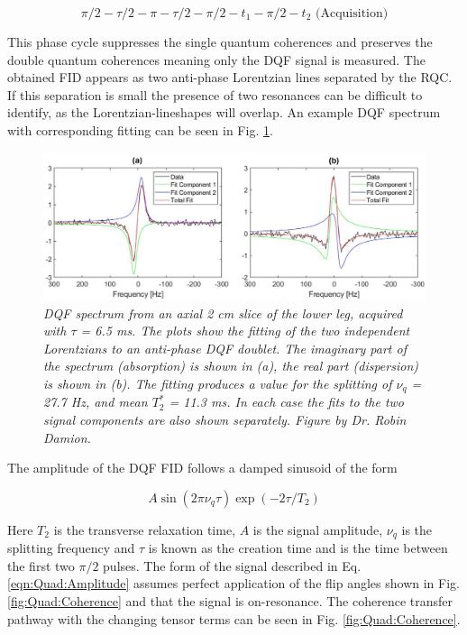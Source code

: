 \begin{equation}
    \pi/2-\tau/2-\pi-\tau/2-\pi/2-t_1-\pi/2-t_2 \textrm{ (Acquisition)}
    \label{eqn:Quad:Pulse}
\end{equation}

This phase cycle suppresses the single quantum coherences and preserves the double quantum coherences meaning only the \ac{DQF} signal is measured. The obtained FID appears as two anti-phase Lorentzian lines separated by the \ac{RQC}. If this separation is small the presence of two resonances can be difficult to identify, as the Lorentzian-lineshapes will overlap. An example \ac{DQF} spectrum with corresponding fitting can be seen in Fig. \ref{fig:Quad:Ex_DQF}. 

\begin{figure}
    \centering
    \includegraphics[width=1\textwidth]{Figures/Quad/Example_DQF.png}
    \caption{\textit{\ac{DQF} spectrum from an axial 2 cm slice of the lower leg, acquired with $\tau$ = 6.5 ms. The plots show the fitting of the two independent Lorentzians to an anti-phase \ac{DQF} doublet. The imaginary part of the spectrum (absorption) is shown in (a), the real part (dispersion) is shown in (b). The fitting produces a value for the splitting of $\nu_q$ = 27.7 Hz, and mean $T_2^*$ = 11.3 ms. In each case the fits to the two signal components are also shown separately. Figure by Dr. Robin Damion.}}
    \label{fig:Quad:Ex_DQF}
\end{figure}

The amplitude of the \ac{DQF} FID follows a damped sinusoid of the form

\begin{equation}
    A\sin(2\pi\nu_q\tau)\exp(-2\tau/T_2)
    \label{eqn:Quad:Amplitude}
\end{equation}

\noindent Here $T_2$ is the transverse relaxation time, $A$ is the signal amplitude, $\nu_q$ is the splitting frequency and $\tau$ is known as the creation time and is the time between the first two $\pi/2$ pulses. The form of the signal described in Eq. \ref{eqn:Quad:Amplitude} assumes perfect application of the flip angles shown in Fig. \ref{fig:Quad:Coherence} and that the signal is on-resonance. The coherence transfer pathway with the changing tensor terms can be seen in Fig. \ref{fig:Quad:Coherence}.


